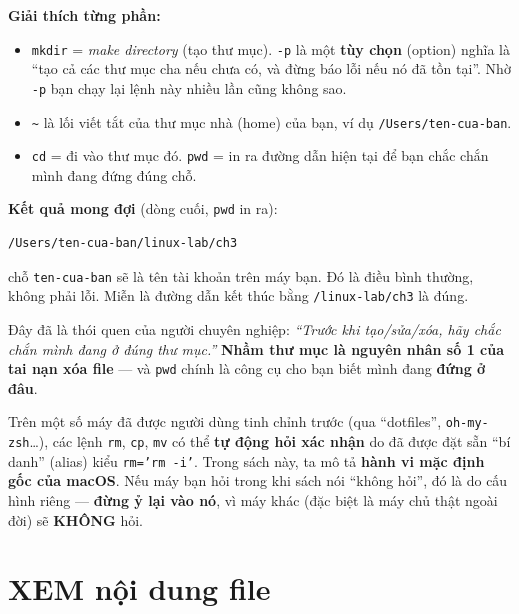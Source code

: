 \documentclass[12pt,a4paper]{article}
\newcommand{\cmd}[1]{\texttt{#1}}
\begin{document}
\textbf{Giải thích từng phần:}
\begin{itemize}[leftmargin=1.4em]
\item \cmd{mkdir} = \textit{make directory} (tạo thư mục). \cmd{-p} là một \textbf{tùy chọn} (option) nghĩa là ``tạo cả các thư mục cha nếu chưa có, và đừng báo lỗi nếu nó đã tồn tại''. Nhờ \cmd{-p} bạn chạy lại lệnh này nhiều lần cũng không sao.
\item \cmd{\textasciitilde{}} là lối viết tắt của thư mục nhà (home) của bạn, ví dụ \cmd{/Users/ten-cua-ban}.
\item \cmd{cd} = đi vào thư mục đó. \cmd{pwd} = in ra đường dẫn hiện tại để bạn chắc chắn mình đang đứng đúng chỗ.
\end{itemize}

\textbf{Kết quả mong đợi} (dòng cuối, \cmd{pwd} in ra):
\begin{Verbatim}
/Users/ten-cua-ban/linux-lab/ch3
\end{Verbatim}

\begin{notebox}[title={Ghi chú: Máy bạn có thể hiển thị khác}]
chỗ \cmd{ten-cua-ban} sẽ là tên tài khoản trên máy bạn. Đó là điều bình thường, không phải lỗi. Miễn là đường dẫn kết thúc bằng \cmd{/linux-lab/ch3} là đúng.
\end{notebox}

\begin{notebox}[title={Mẹo: Vì sao gõ \texttt{pwd}?}]
Đây đã là thói quen của người chuyên nghiệp: \textit{``Trước khi tạo/sửa/xóa, hãy chắc chắn mình đang ở đúng thư mục.''} \textbf{Nhầm thư mục là nguyên nhân số 1 của tai nạn xóa file} --- và \cmd{pwd} chính là công cụ cho bạn biết mình đang \textbf{đứng ở đâu}.
\end{notebox}

\begin{notebox}[title={Lưu ý nhỏ về máy đã cấu hình sẵn}]
Trên một số máy đã được người dùng tinh chỉnh trước (qua ``dotfiles'', \cmd{oh-my-zsh}\ldots), các lệnh \cmd{rm}, \cmd{cp}, \cmd{mv} có thể \textbf{tự động hỏi xác nhận} do đã được đặt sẵn ``bí danh'' (alias) kiểu \cmd{rm='rm -i'}. Trong sách này, ta mô tả \textbf{hành vi mặc định gốc của macOS}. Nếu máy bạn hỏi trong khi sách nói ``không hỏi'', đó là do cấu hình riêng --- \textbf{đừng ỷ lại vào nó}, vì máy khác (đặc biệt là máy chủ thật ngoài đời) sẽ \textbf{KHÔNG} hỏi.
\end{notebox}

\section{XEM nội dung file}
\end{document}

